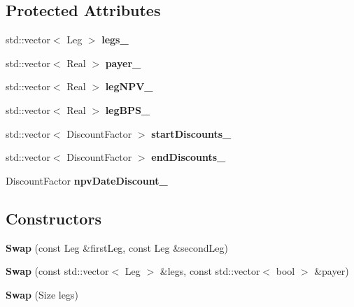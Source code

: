\subsection*{Protected Attributes}
\begin{DoxyCompactItemize}
\item 
std\+::vector$<$ Leg $>$ {\bfseries legs\+\_\+}\label{class_quant_lib_1_1_swap_a1ca08a7d6e5957950d40383eb4cf0b63}

\item 
std\+::vector$<$ Real $>$ {\bfseries payer\+\_\+}\label{class_quant_lib_1_1_swap_a82468c93e5a364d73e164df46bd50445}

\item 
std\+::vector$<$ Real $>$ {\bfseries leg\+N\+P\+V\+\_\+}\label{class_quant_lib_1_1_swap_ac85f31b7bf3b97e6c03848c64bef33af}

\item 
std\+::vector$<$ Real $>$ {\bfseries leg\+B\+P\+S\+\_\+}\label{class_quant_lib_1_1_swap_af40f759b518542c642d71cbc262cab84}

\item 
std\+::vector$<$ Discount\+Factor $>$ {\bfseries start\+Discounts\+\_\+}\label{class_quant_lib_1_1_swap_aa235d3e00058faa863f579d9665301e4}

\item 
std\+::vector$<$ Discount\+Factor $>$ {\bfseries end\+Discounts\+\_\+}\label{class_quant_lib_1_1_swap_ac3b82c6fb8b5951424767b5e95e9a0b3}

\item 
Discount\+Factor {\bfseries npv\+Date\+Discount\+\_\+}\label{class_quant_lib_1_1_swap_a390b5eebe9b8a8915d393465a93809ad}

\end{DoxyCompactItemize}
\subsection*{Constructors}
\begin{DoxyCompactItemize}
\item 
{\bf Swap} (const Leg \&first\+Leg, const Leg \&second\+Leg)
\item 
{\bf Swap} (const std\+::vector$<$ Leg $>$ \&legs, const std\+::vector$<$ bool $>$ \&payer)
\item 
{\bf Swap} (Size legs)
\end{DoxyCompactItemize}
